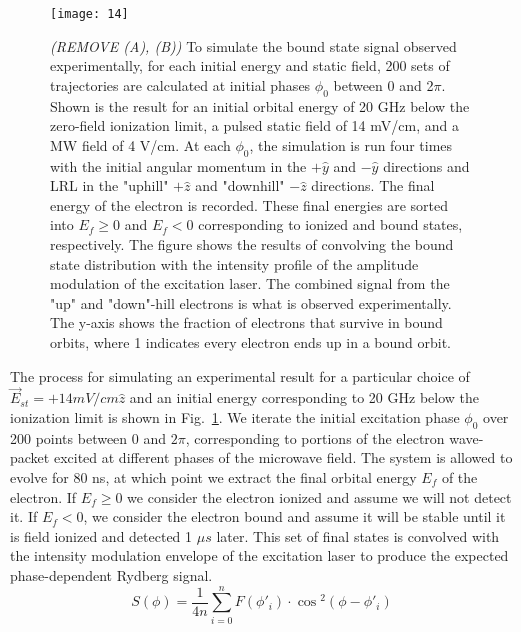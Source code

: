\documentclass[aps,pra,preprint,groupedaddress]{revtex4-1}
\begin{document}
\begin{figure}
	\texttt{[image: 14]}
	\caption{\emph{(REMOVE (A), (B))} To simulate the bound state signal observed experimentally, for each initial energy and static field, 200 sets of trajectories are calculated at initial phases $\phi_0$ between 0 and 2$\pi$. Shown is the result for an initial orbital energy of 20 GHz below the zero-field ionization limit, a pulsed static field of 14 mV/cm, and a MW field of 4 V/cm. At each $\phi_0$, the simulation is run four times with the initial angular momentum in the $+\hat{y}$ and $-\hat{y}$ directions and LRL in the "uphill" $+\hat{z}$ and "downhill" $-\hat{z}$ directions. The final energy of the electron is recorded. These final energies are sorted into $E_f\geq 0$ and $E_f<0$ corresponding to ionized and bound states, respectively. The figure shows the results of convolving the bound state distribution with the intensity profile of the amplitude modulation of the excitation laser. The combined signal from the "up" and "down"-hill electrons is what is observed experimentally. The y-axis shows the fraction of electrons that survive in bound orbits, where 1 indicates every electron ends up in a bound orbit.}
	\label{fig:ModEval}
\end{figure}

The process for simulating an experimental result for a particular choice of $\vec{E}_{st} = + 14 mV/cm \hat{z}$ and an initial energy corresponding to 20 GHz below the ionization limit is shown in Fig.~\ref{fig:ModEval}. We iterate the initial excitation phase $\phi_0$ over 200 points between 0 and $2\pi$, corresponding to portions of the electron wave-packet excited at different phases of the microwave field. The system is allowed to evolve for 80 ns, at which point we extract the final orbital energy $E_f$ of the electron. If $E_f \geq 0$ we consider the electron ionized and assume we will not detect it. If $E_f < 0$, we consider the electron bound and assume it will be stable until it is field ionized and detected 1 $\mu s$ later. This set of final states is convolved with the intensity modulation envelope of the excitation laser to produce the expected phase-dependent Rydberg signal.
\begin{equation}
S(\phi) = \frac{1}{4n} \sum_{i=0}^{n} F(\phi\prime_i) \cdot \cos{^2(\phi - \phi\prime_i)}
\end{equation}
\end{document}
